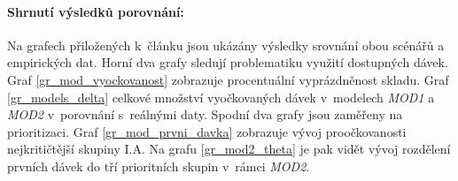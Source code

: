 \paragraph{Shrnutí výsledků porovnání:} Na grafech přiložených k~článku jsou ukázány výsledky srovnání obou scénářů a empirických dat. Horní dva grafy sledují problematiku využití dostupných dávek. Graf \ref{gr_mod_vyockovanost} zobrazuje procentuální vyprázdněnost skladu. Graf \ref{gr_models_delta} celkové množství vyočkovaných dávek v~modelech \emph{MOD1} a \emph{MOD2} v~porovnání s~reálnými daty.
%
Spodní dva grafy jsou zaměřeny na prioritizaci.
Graf \ref{gr_mod_prvni_davka} zobrazuje vývoj proočkovanosti nejkritičtější skupiny I.A. Na grafu  \ref{gr_mod2_theta} je pak vidět vývoj rozdělení prvních dávek do tří prioritních skupin v~rámci \emph{MOD2}.


